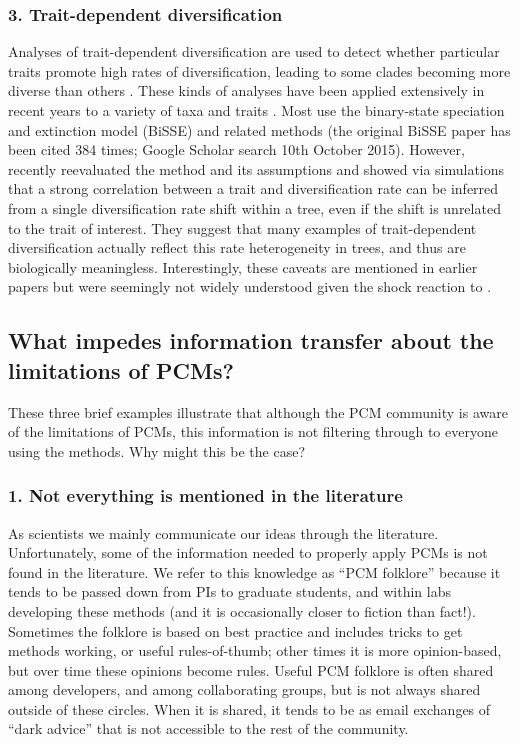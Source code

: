 \documentclass[a4paper,12pt]{article}
\begin{document}
\subsubsection{3. Trait-dependent diversification} 
Analyses of trait-dependent diversification are used to detect whether particular traits promote high rates of diversification, leading to some clades becoming more diverse than others \citep{nee1994reconstructed}. 
These kinds of analyses have been applied extensively in recent years to a variety of taxa and traits \citep[e.g.][]{Goldberg22102010,Price01052012,Givnish201455,ELE:ELE12168}.
Most use the binary-state speciation and extinction model (BiSSE) and related methods (the original BiSSE paper \citet{maddison2007estimating} has been cited 384 times; Google Scholar search 10th October 2015).
However, \citet{rabosky2015model} recently reevaluated the method and its assumptions and showed via simulations that a strong correlation between a trait and diversification rate can be inferred from a single diversification rate shift within a tree, even if the shift is unrelated to the trait of interest.
They suggest that many examples of trait-dependent diversification actually reflect this rate heterogeneity in trees, and thus are biologically meaningless.
Interestingly, these caveats are mentioned in earlier papers \citep{maddison2007estimating,fitzjohn2010quantitative,FitzJohn:2012aa} but were seemingly not widely understood given the shock reaction to \citet{rabosky2015model}.

\subsection{What impedes information transfer about the limitations of PCMs?}
These three brief examples illustrate that although the PCM community is aware of the limitations of PCMs, this information is not filtering through to everyone using the methods. 
Why might this be the case?

  \subsubsection{1. Not everything is mentioned in the literature}
    As scientists we mainly communicate our ideas through the literature. 
    Unfortunately, some of the information needed to properly apply PCMs is not found in the literature. 
    We refer to this knowledge as ``PCM folklore'' because it tends to be passed down from PIs to graduate students, and within labs developing these methods (and it is occasionally closer to fiction than fact!).
    Sometimes the folklore is based on best practice and includes tricks to get methods working, or useful rules-of-thumb; other times it is more opinion-based, but over time these opinions become rules. 
    Useful PCM folklore is often shared among developers, and among collaborating groups, but is not always shared outside of these circles. 
    When it is shared, it tends to be as email exchanges of ``dark advice'' that is not accessible to the rest of the community.
\end{document}
